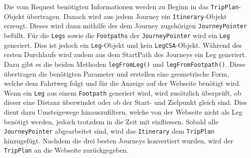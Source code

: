 Die vom Request benötigten Informationen werden zu Beginn in das \texttt{TripPlan}-Objekt übertragen. Danach wird aus jedem Journey ein \texttt{Itinerary}-Objekt erzeugt. Dieses wird dann mithilfe der dem Journey zugehörigen \texttt{JourneyPointer} befüllt. Für die \texttt{Legs} sowie die \texttt{Footpaths} der \texttt{JourneyPointer} wird ein \texttt{Leg} generiert. Dies ist jedoch ein \texttt{Leg}-Objekt und kein \texttt{LegCSA}-Objekt. Während des ersten Durchlaufs wird zudem aus dem StartPath des Journeys ein Leg generiert. Dazu gibt es die beiden Methoden \texttt{legFromLeg()} und \texttt{legFromFootpath()}. Diese übertragen die benötigten Parameter und erstellen eine geometrische Form, welche dem Fahrtweg folgt und für die Anzeige auf der Webseite benötigt wird. Wenn ein \texttt{Leg} aus einem \texttt{Footpath} generiert wird, wird zusätzlich überprüft, ob dieser eine Distanz überwindet oder ob der Start- und Zielpunkt gleich sind. Dies dient dazu Umsteigewege hinauszufiltern, welche von der Webseite nicht als Leg benötigt werden, jedoch trotzdem in die Zeit mit einfliessen. Sobald alle \texttt{JourneyPointer} abgearbeitet sind, wird das \texttt{Itinerary} dem \texttt{TripPlan} hinzugefügt. Nachdem die drei besten Journeys konvertiert wurden, wird der \texttt{TripPlan} an die Webseite zurückgegeben.
